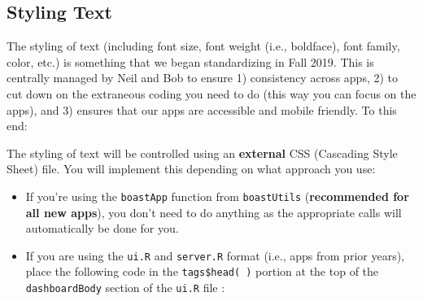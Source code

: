 \documentclass[
]{book}
\newenvironment{Shaded}{\begin{snugshade}}{\end{snugshade}}
\newcommand{\CommentTok}[1]{\textcolor[rgb]{0.56,0.35,0.01}{\textit{#1}}}
\newcommand{\DataTypeTok}[1]{\textcolor[rgb]{0.13,0.29,0.53}{#1}}
\newcommand{\DecValTok}[1]{\textcolor[rgb]{0.00,0.00,0.81}{#1}}
\newcommand{\KeywordTok}[1]{\textcolor[rgb]{0.13,0.29,0.53}{\textbf{#1}}}
\newcommand{\NormalTok}[1]{#1}
\newcommand{\OperatorTok}[1]{\textcolor[rgb]{0.81,0.36,0.00}{\textbf{#1}}}
\newcommand{\StringTok}[1]{\textcolor[rgb]{0.31,0.60,0.02}{#1}}
\providecommand{\tightlist}{%
  \setlength{\itemsep}{0pt}\setlength{\parskip}{0pt}}
\begin{document}
\hypertarget{textStyle}{%
\subsection{Styling Text}\label{textStyle}}

The styling of text (including font size, font weight (i.e., boldface), font family, color, etc.) is something that we began standardizing in Fall 2019. This is centrally managed by Neil and Bob to ensure 1) consistency across apps, 2) to cut down on the extraneous coding you need to do (this way you can focus on the apps), and 3) ensures that our apps are accessible and mobile friendly. To this end:

The styling of text will be controlled using an \textbf{external} CSS (Cascading Style Sheet) file. You will implement this depending on what approach you use:

\begin{itemize}
\tightlist
\item
  If you're using the \texttt{boastApp} function from \texttt{boastUtils} (\textbf{recommended for all new apps}), you don't need to do anything as the appropriate calls will automatically be done for you.
\item
  If you are using the \texttt{ui.R} and \texttt{server.R} format (i.e., apps from prior years), place the following code in the \texttt{tags\$head(\ )} portion at the top of the \texttt{dashboardBody} section of the \texttt{ui.R} file :
\end{itemize}

\begin{Shaded}
\end{Shaded}
\end{document}
